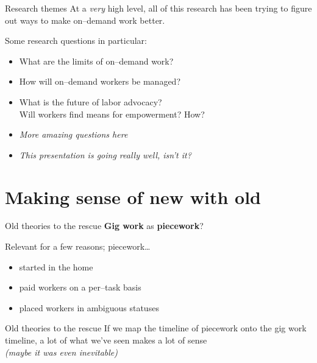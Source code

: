 \documentclass{beamer}
\begin{document}
\begin{frame}{Research themes}
  At a \textit{very} high level, all of this research has been trying to figure out ways to make on--demand work better.

  Some research questions in particular:
  \begin{itemize}[<+- | alert@+>]
    \item What are the limits of on--demand work?
                                                                      \cite{akerlof1970market,foundry}
    \item How will on--demand workers be managed?
                                                                      \cite{crowdworkFuture,uberAlgorithm}
    \item What is the future of labor advocacy?
          \\Will workers find means for empowerment? How?
                                                                      \cite{turkopticon,dynamo}
    \item \textit{More amazing questions here}
    \item \textit{This presentation is going really well, isn't it?}
  \end{itemize}
\end{frame}


\section{Making sense of new with old}

\begin{frame}{Old theories to the rescue}
  \textbf{Gig work} as \textbf{piecework}?

  Relevant for a few reasons; piecework\dots
  \begin{itemize}
    \item started in the home
    \item paid workers on a per--task basis
    \item placed workers in ambiguous statuses
  \end{itemize}
\end{frame}

\begin{frame}{Old theories to the rescue}
  If we map the timeline of piecework onto the gig work timeline,
  a lot of what we've seen makes a lot of sense
  \\\textit{(maybe it was even inevitable)}
\end{frame}
\end{document}
